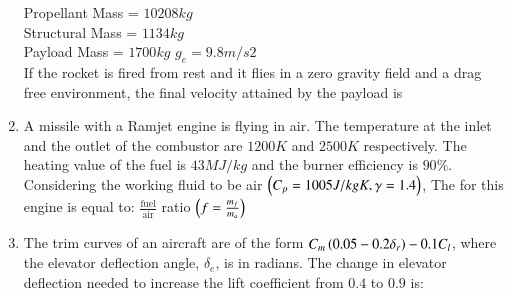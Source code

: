 \documentclass[journal]{IEEEtran}
\begin{document}
\begin{enumerate}
		Propellant Mass = $10208 kg$\\
		Structural Mass = $1134 kg$\\
		Payload Mass = $1700 kg$
		$g_e = 9.8 m/s2$\\
		If the rocket is fired from rest and it flies in a zero gravity field and a drag free environment, the final velocity attained by the payload is
	\begin{enumerate}
	\begin{multicols}{2}
		\item  $9729.3m/s$
		 \columnbreak
		\item  $897.3m/s$
    \end{multicols}
\end{enumerate}
\item A missile with a Ramjet engine is flying in air. The temperature at the inlet and the outlet of the combustor are $1200 K$ and $2500 K$ respectively. The heating value of the fuel is $43 MJ/kg$ and the burner efficiency is $90\%$. Considering the working fluid to be air $\left(C_p = 1005 J/kgK, \gamma = 1.4\right)$, The for this engine is equal to: $\frac{\text{fuel}}{\text{air}}$ ratio $\left(f=\frac{m_f}{m_a}\right)$
	\begin{enumerate}
\end{enumerate}
\item The trim curves of an aircraft are of the form $C_m \left(0.05-0.2\delta_r\right)-0.1C_l$, where the elevator deflection angle, $\delta_e$, is in radians. The change in elevator deflection needed to increase the lift coefficient from $0.4$ to $0.9$ is:
	\begin{enumerate}
\end{enumerate}
\end{enumerate}
\end{document}
